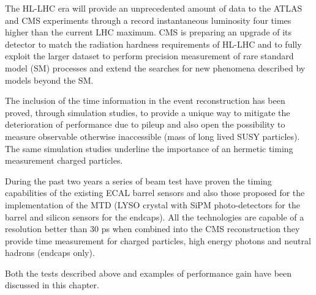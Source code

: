 The HL-LHC era will provide an unprecedented amount of data to the ATLAS and CMS experiments through a record
instantaneous luminosity four times higher than the current LHC maximum. CMS is preparing an upgrade of its
detector to match the radiation hardness requirements of HL-LHC and to fully exploit the larger dataset to
perform precision measurement of rare standard model (SM) processes and extend the searches for new phenomena described by
models beyond the SM.

The inclusion of the time information in the event reconstruction has been proved, through simulation studies,
to provide a unique way to mitigate the deterioration of performance due to pileup and also open the possibility
to measure observable otherwise inaccessible (mass of long lived SUSY particles). The same simulation
studies underline the importance of an hermetic timing measurement charged particles.

During the past two years a series of beam test have proven the timing capabilities of the existing
ECAL barrel sensors and also those proposed for the implementation of the MTD (LYSO crystal with SiPM photo-detectors for
the barrel and silicon sensors for the endcaps). All the technologies are capable of a resolution better than
30 ps when combined into the CMS reconstruction they provide time measurement for charged particles, high energy photons
and neutral hadrons (endcaps only).

Both the tests described above and examples of performance gain have been discussed in this chapter.











  